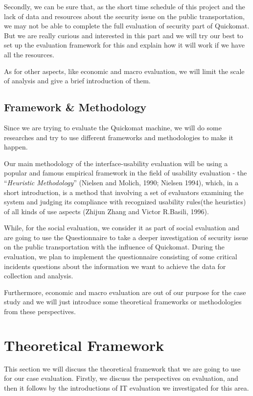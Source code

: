 \documentclass[twocolumn]{article}
\begin{document}
Secondly, we can be sure that, as the short time schedule of this project and the lack of data and resources about the security issue on the public transportation, we may not be able to complete the full evaluation of security part of Quickomat. But we are really curious and interested in this part and we will try our best to set up the evaluation framework for this and explain how it will work if we have all the resources. 

As for other aspects, like economic and  macro evaluation, we will limit the scale of analysis and give a brief introduction of them.

\subsection{Framework \& Methodology}
Since we are trying to evaluate the Quickomat machine, we will do some researches and try to use different frameworks and methodologies to make it happen.

Our main methodology of the interface-usability evaluation will be using a popular and famous empirical framework in the field of usability evaluation - the “\emph{Heuristic Methodology}” (Nielsen and Molich, 1990; Nielsen 1994), which, in a short introduction, is a method that involving a set of evaluators examining the system and judging its compliance with recognized usability rules(the heuristics) of all kinds of use aspects (Zhijun Zhang and Victor R.Basili, 1996). 

While, for the social evaluation, we consider it as part of social evaluation and are going to use the Questionnaire to take a deeper investigation of security issue on the public transportation with the influence of Quickomat. During the evaluation, we plan to implement the questionnaire consisting of some critical incidents questions about the information we want to achieve the data for collection and analysis. 

Furthermore, economic and macro evaluation are out of our purpose for the case study and we will just introduce some theoretical frameworks or methodologies from these perspectives.

\section{Theoretical Framework}
This section we will discuss the theoretical framework that we are going to use for our case evaluation. Firstly, we discuss the perspectives on evaluation, and then it follows by the introductions of IT evaluation we investigated for this area.
\end{document}
